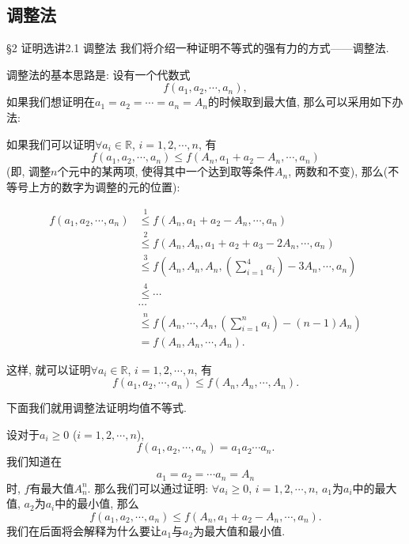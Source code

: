 \documentclass[serif]{beamer}
\begin{document}
\subsection{\kaishu 调整法}

\begin{frame}{\S2 证明选讲}{2.1 调整法}
	我们将介绍一种证明不等式的强有力的方式——调整法.\par
	调整法的基本思路是: 设有一个代数式
	\[f\left(a_1,a_2,\cdots,a_n\right),\]
	如果我们想证明在$a_1=a_2=\cdots=a_n=A_n$的时候取到最大值, 那么可以采用如下办法:\par
	如果我们可以证明$\forall a_i\in\mathbb{R}$, $i=1,2,\cdots,n$, 有
	\[f\left(a_1,a_2,\cdots,a_n\right)\le f\left(A_n,a_1+a_2-A_n,\cdots,a_n\right)\]
	(即, 调整$n$个元中的某两项, 使得其中一个达到取等条件$A_n$, 两数和不变), 那么(不等号上方的数字为调整的元的位置):
\end{frame}

\begin{frame}
	\begin{align*}
		f\left(a_1,a_2,\cdots,a_n\right)&\overset{1}{\le}f\left(A_n,a_1+a_2-A_n,\cdots,a_n\right)\\
		&\overset{2}{\le}f\left(A_n,A_n,a_1+a_2+a_3-2A_n,\cdots,a_n\right)\\
		&\overset{3}{\le}f\left(A_n,A_n,A_n,\left(\sum\limits_{i=1}^4{a_i}\right)-3A_n,\cdots,a_n\right)\\
		&\overset{4}{\le}\cdots\\
		&\cdots\\
		&\overset{n}{\le}f\left(A_n,\cdots,A_n,\left(\sum\limits_{i=1}^n{a_i}\right)-(n-1)A_n\right)\\
		&=f\left(A_n,A_n,\cdots,A_n\right).
	\end{align*}\par
	这样, 就可以证明$\forall a_i\in\mathbb{R}$, $i=1,2,\cdots,n$, 有
	\[f\left(a_1,a_2,\cdots,a_n\right)\le f\left(A_n,A_n,\cdots,A_n\right).\]
\end{frame}

\begin{frame}
	下面我们就用调整法证明均值不等式.\par
	设对于$a_i\ge0$ ($i=1,2,\cdots,n$),
	\[f\left(a_1,a_2,\cdots,a_n\right)=a_1a_2\cdots a_n.\]
	我们知道在
	\[a_1=a_2=\cdots a_n=A_n\]
	时, $f$有最大值$A_n^n$. 那么我们可以通过证明: $\forall a_i\ge0$, $i=1,2,\cdots,n$, $a_1$为$a_i$中的最大值, $a_2$为$a_i$中的最小值, 那么
	\[f\left(a_1,a_2,\cdots,a_n\right)\le f\left(A_n,a_1+a_2-A_n,\cdots,a_n\right).\]
	我们在后面将会解释为什么要让$a_1$与$a_2$为最大值和最小值.
\end{frame}
\end{document}
